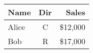 \begin{tabular}{lcr}
	\hline 
	Name & Dir & Sales \\
	\hline
	Alice & C & \$12,000\\
	Bob & R & \$17,000\\
	\hline
\end{tabular}